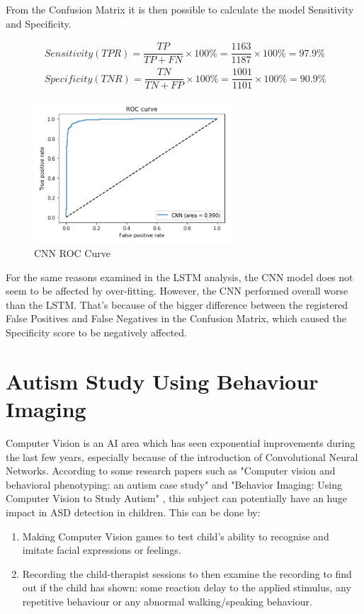 
From the Confusion Matrix it is then possible to calculate the model Sensitivity and Specificity.

\begin{align}
\ Sensitivity (TPR) = \dfrac{TP}{TP + FN}\times100\% = \dfrac{1163}{1187}\times100\% = 97.9\% \label{eq:1} 
\\
\ Specificity (TNR)  = \dfrac{TN}{TN + FP}\times100\%
= \dfrac{1001}{1101}\times100\% = 90.9\% 
\end{align}

\begin{figure}[ht!]%
    \centering
    \includegraphics[width=7.5cm]{images/cnnorc.PNG}%
    \caption{CNN ROC Curve}
\end{figure}

For the same reasons examined in the LSTM analysis, the CNN model does not seem to be affected by over-fitting. However, the CNN performed overall worse than the LSTM. That's because of the bigger difference between the registered False Positives and False Negatives in the Confusion Matrix, which caused the Specificity score to be negatively affected.

\section{Autism Study Using Behaviour Imaging}
Computer Vision is an AI area which has seen exponential improvements during the last few years, especially because of the introduction of Convolutional Neural Networks. According to some research papers such as "Computer vision and behavioral phenotyping: an autism case study" \cite{visionpaper1} and "Behavior Imaging: Using Computer Vision to Study Autism" \cite{visionpaper2}, this subject can potentially have an huge impact in ASD detection in children. This can be done by: 
\begin{enumerate}
\itemsep0em
\item Making Computer Vision games to test child's ability to recognise and imitate facial expressions or feelings.
\item Recording the child-therapist sessions to then examine the recording to find out if the child has shown: some reaction delay to the applied stimulus, any repetitive behaviour or any abnormal walking/speaking behaviour.
\end{enumerate}

